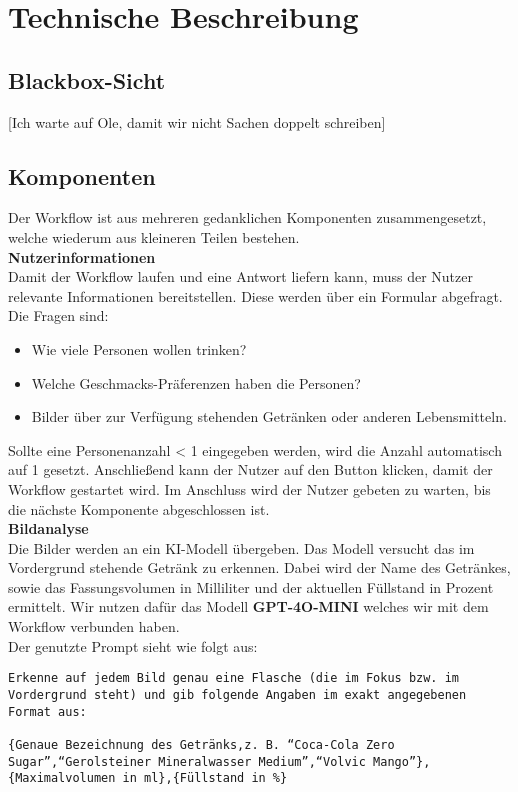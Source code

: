 \section{Technische Beschreibung}\label{sec:descr} %

\subsection{Blackbox-Sicht}\label{sec:descr:blackbox}
[Ich warte auf Ole, damit wir nicht Sachen doppelt schreiben]

\subsection{Komponenten}\label{sec:descr:components}

Der Workflow ist aus mehreren gedanklichen Komponenten zusammengesetzt, welche wiederum aus kleineren Teilen bestehen. \\

\textbf{Nutzerinformationen} \\
Damit der Workflow laufen und eine Antwort liefern kann, muss der Nutzer relevante Informationen bereitstellen.
Diese werden über ein Formular abgefragt. Die Fragen sind:
\begin{itemize}
    \item Wie viele Personen wollen trinken?
    \item Welche Geschmacks-Präferenzen haben die Personen?
    \item Bilder über zur Verfügung stehenden Getränken oder anderen Lebensmitteln.
\end{itemize}

Sollte eine Personenanzahl < 1 eingegeben werden, wird die Anzahl automatisch auf 1 gesetzt.
Anschließend kann der Nutzer auf den Button klicken, damit der Workflow gestartet wird.
Im Anschluss wird der Nutzer gebeten zu warten, bis die nächste Komponente abgeschlossen ist. \\

\textbf{Bildanalyse} \\
Die Bilder werden an ein KI-Modell übergeben. Das Modell versucht das im Vordergrund stehende
Getränk zu erkennen. Dabei wird der Name des Getränkes, sowie das Fassungsvolumen in Milliliter und
der aktuellen Füllstand in Prozent ermittelt. Wir nutzen dafür das Modell \textbf{GPT-4O-MINI}
welches wir mit dem Workflow verbunden haben. \\

Der genutzte Prompt sieht wie folgt aus:
\begin{verbatim}
Erkenne auf jedem Bild genau eine Flasche (die im Fokus bzw. im Vordergrund steht) und gib folgende Angaben im exakt angegebenen Format aus:

{Genaue Bezeichnung des Getränks,z. B. “Coca-Cola Zero Sugar”,“Gerolsteiner Mineralwasser Medium”,“Volvic Mango”},{Maximalvolumen in ml},{Füllstand in %}
\end{verbatim}

